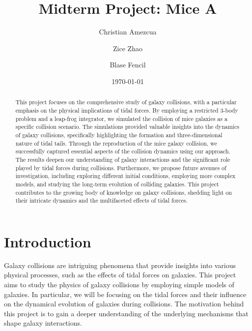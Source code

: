 \documentclass[reprint, amsmath, amssymb, aps]{revtex4-2}
\begin{document}
\title{Midterm Project: Mice A}

\author{Christian Amezcua}
\author{Zice Zhao}
\author{Blase Fencil}



\date{\today}

\begin{abstract}
    This project focuses on the comprehensive study of galaxy collisions, with a particular emphasis on the physical implications of tidal forces. By employing a restricted 3-body problem and a leap-frog integrator, we simulated the collision of mice galaxies as a specific collision scenario. The simulations provided valuable insights into the dynamics of galaxy collisions, specifically highlighting the formation and three-dimensional nature of tidal tails. Through the reproduction of the mice galaxy collision, we successfully captured essential aspects of the collision dynamics using our approach. The results deepen our understanding of galaxy interactions and the significant role played by tidal forces during collisions. Furthermore, we propose future avenues of investigation, including exploring different initial conditions, employing more complex models, and studying the long-term evolution of colliding galaxies. This project contributes to the growing body of knowledge on galaxy collisions, shedding light on their intricate dynamics and the multifaceted effects of tidal forces.
\end{abstract}

\maketitle

\section{Introduction}
\label{sec:intro}

Galaxy collisions are intriguing phenomena that provide insights into various physical processes, such as the effects of tidal forces on galaxies. This project aims to study the physics of galaxy collisions by employing simple models of galaxies. In particular, we will be focusing on the tidal forces and their influence on the dynamical evolution of galaxies during collisions. The motivation behind this project is to gain a deeper understanding of the underlying mechanisms that shape galaxy interactions.
\end{document}
